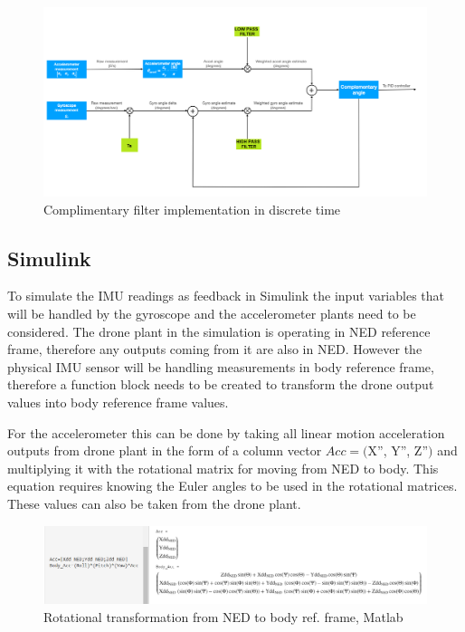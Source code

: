 \begin{figure}[H]
    \begin{center}
    \includegraphics[scale = 0.5]{pictures/IMU/complementary.png}
    \end{center}
    \caption{Complimentary filter implementation in discrete time\cite{cf}}  
    \label{fig:compl_filt}
\end{figure}

\subsection{Simulink}

To simulate the IMU readings as feedback in Simulink the input variables that will be handled by the gyroscope and the accelerometer plants need to be considered. The drone plant in the simulation is operating in NED reference frame, therefore any outputs coming from it are also in NED. However the physical IMU sensor will be handling measurements in body reference frame, therefore a function block needs to be created to transform the drone output values into body reference frame values. 

For the accelerometer this can be done by taking all linear motion acceleration outputs from drone plant in the form of a column vector $Acc=($X'', Y'', Z''$)$ and multiplying it with the rotational matrix for moving from NED to body. This equation requires knowing the Euler angles to be used in the rotational matrices. These values can also be taken from the drone plant.


\begin{figure}[H]
    \begin{center}
    \includegraphics[scale = 0.5]{pictures/IMU/NED_to_body_acc.png}
    \end{center}
    \caption{Rotational transformation from NED to body ref. frame, Matlab}
    \label{fig:my_label}
\end{figure}

